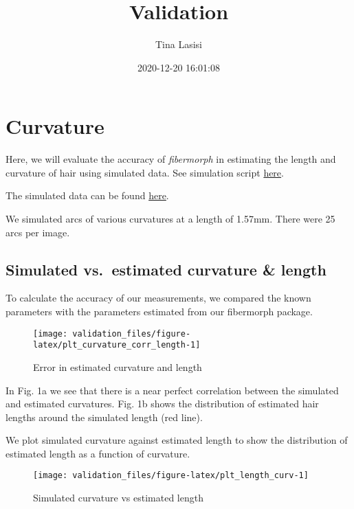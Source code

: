 \documentclass[
]{article}
\title{Validation}
\author{Tina Lasisi}
\date{2020-12-20 16:01:08}
\begin{document}
\maketitle

\hypertarget{curvature}{%
\section{Curvature}\label{curvature}}

Here, we will evaluate the accuracy of \emph{fibermorph} in estimating
the length and curvature of hair using simulated data. See simulation
script
\href{https://github.com/tinalasisi/2020_HairPheno_manuscript/blob/main/code/simhair.R}{here}.

The simulated data can be found
\href{https://github.com/tinalasisi/2020_HairPheno_manuscript/blob/main/data/concat_simcurvature_Nov152020.csv}{here}.

We simulated arcs of various curvatures at a length of 1.57mm. There
were 25 arcs per image.

\hypertarget{simulated-vs.-estimated-curvature-length}{%
\subsection{Simulated vs.~estimated curvature \&
length}\label{simulated-vs.-estimated-curvature-length}}

To calculate the accuracy of our measurements, we compared the known
parameters with the parameters estimated from our fibermorph package.

\begin{figure}
\texttt{[image: validation\_files/figure-latex/plt\_curvature\_corr\_length-1]} \caption{Error in estimated curvature and length}\label{fig:plt_curvature_corr_length}
\end{figure}

In Fig. 1a we see that there is a near perfect correlation between the
simulated and estimated curvatures. Fig. 1b shows the distribution of
estimated hair lengths around the simulated length (red line).

We plot simulated curvature against estimated length to show the
distribution of estimated length as a function of curvature.

\begin{figure}
\texttt{[image: validation\_files/figure-latex/plt\_length\_curv-1]} \caption{Simulated curvature vs estimated length}\label{fig:plt_length_curv}
\end{figure}
\end{document}
